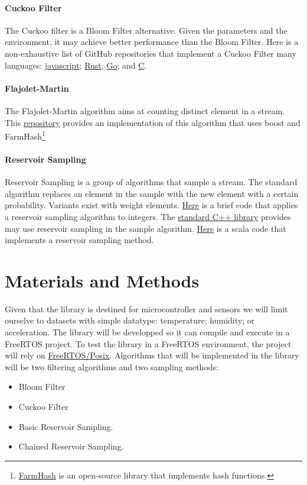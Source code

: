 \documentclass{article}
\begin{document}
\paragraph{Cuckoo Filter}
	The Cuckoo filter is a Bloom Filter alternative. Given the parameters and the environment,
	it may achieve better performance than the Bloom Filter.
	Here is a non-exhaustive list of GitHub repositories that implement a Cuckoo Filter many languages: \href{https://github.com/vijayee/cuckoo-filter}{javascript};
	\href{https://github.com/seiflotfy/rust-cuckoofilter}{Rust};
	\href{https://github.com/seiflotfy/cuckoofilter}{Go};
	and \href{https://github.com/begeekmyfriend/CuckooFilter}{C}. 

\paragraph{Flajolet-Martin}
	The Flajolet-Martin algorithm aims at counting distinct element in a stream.
	This \href{https://github.com/svengato/FlajoletMartin}{repository} provides
	an implementation of this algorithm that uses boost and
	FarmHash\footnote{\href{https://github.com/google/farmhash}{FarmHash} is an open-source library that implements hash functions.}

\paragraph{Reservoir Sampling}
	Reservoir Sampling is a group of algorithms that sample a stream.
	The standard algorithm replaces an element in the sample with the new element with a certain probability.
	Variants exist with weight elements. 
	\href{https://www.geeksforgeeks.org/reservoir-sampling/}{Here} is a brief code that applies a reservoir sampling algorithm to integers.
	The \href{https://en.cppreference.com/w/cpp/algorithm/sample}{standard C++ library} provides may use reservoir sampling in the sample algorithm.
	\href{http://erikerlandson.github.io/blog/2015/11/20/very-fast-reservoir-sampling/}{Here} is a scala code that implements a reservoir sampling method.

\section{Materials and Methods}
Given that the library is destined for microcontroller and sensors we will limit ourselve to datasets
with simple datatype: temperature; humidity; or acceleration.
The library will be developped so it can compile and execute in a FreeRTOS project.
To test the library in a FreeRTOS environment, the project will rely on
\href{https://www.freertos.org/FreeRTOS-simulator-for-Linux.html}{FreeRTOS/Posix}.
Algorithms that will be implemented in the library will be two filtering algorithms and two sampling methods:
\begin{itemize}
	\item Bloom Filter
	\item Cuckoo Filter
	\item Basic Reservoir Sampling.
	\item Chained Reservoir Sampling.
\end{itemize}
\end{document}

